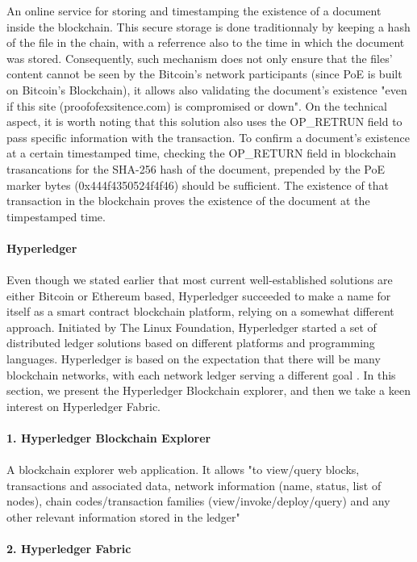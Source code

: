 An online service for storing and timestamping the existence of a document inside the blockchain. This secure storage is done traditionnaly by keeping a hash of the file in the chain, with a referrence also to the time in which the document was stored. Consequently, such mechanism does not only ensure that the files' content cannot be seen by the Bitcoin's network participants (since PoE is built on Bitcoin's Blockchain), it allows also validating the document's existence "even if this site (proofofexsitence.com) is compromised or down". On the technical aspect, it is worth noting that this  solution also uses the OP\_RETRUN field to pass specific information with the transaction. To confirm a document's existence at a certain timestamped time, checking the OP\_RETURN field in blockchain trasancations for the SHA-256 hash of the document, prepended by the PoE marker bytes (0x444f4350524f4f46) should be sufficient. The existence of that transaction in the blockchain proves the existence of the document at the timpestamped time.\\
\\
\textbf{\large{Hyperledger}}\\
\\
Even though we stated earlier that most current well-established solutions are either Bitcoin or Ethereum based, Hyperledger succeeded to make a name for itself as a smart contract blockchain platform, relying on a somewhat different approach. Initiated by The Linux Foundation, Hyperledger started a set of distributed ledger solutions based on different platforms and programming languages. Hyperledger is based on the expectation that there will be many blockchain networks, with each network ledger serving a different goal \cite{hype}. In this section, we present the Hyperledger Blockchain explorer, and then we take a keen interest on Hyperledger Fabric.
\\
\\
\textbf{\large{1. Hyperledger Blockchain Explorer}}\\
\\
A blockchain explorer web application. It allows "to view/query blocks, transactions and associated data, network information (name, status, list of nodes), chain codes/transaction families (view/invoke/deploy/query) and any other relevant information stored in the ledger" \cite{hyperledger}
\\
\\
\textbf{\large{2. Hyperledger Fabric}}\\
\\
